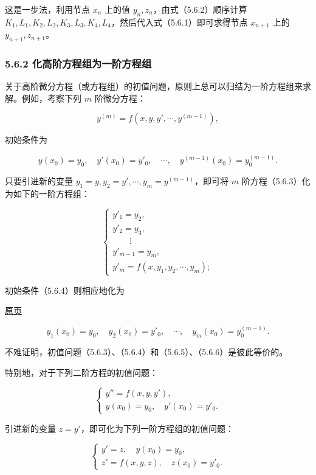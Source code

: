 \documentclass[
  10pt,
  fontset=fandol]{ctexart}
\begin{document}
这是一步法，利用节点 \(x_n\) 上的值 \(y_n,z_n\)，由式（5.6.2）顺序计算 \(K_1,\allowbreak L_1,\allowbreak K_2,\allowbreak L_2,\allowbreak K_3,\allowbreak L_3,\allowbreak K_4,\allowbreak L_4\)，然后代入式（5.6.1）即可求得节点 \(x_{n+1}\) 上的 \(y_{n+1},z_{n+1}\)。

\subsubsection{5.6.2 化高阶方程组为一阶方程组}\label{ux5316ux9ad8ux9636ux65b9ux7a0bux7ec4ux4e3aux4e00ux9636ux65b9ux7a0bux7ec4}

关于高阶微分方程（或方程组）的初值问题，原则上总可以归结为一阶方程组来求解。例如，考察下列 \(m\) 阶微分方程：

\[
y^{(m)}=f(x,y,y',\cdots,y^{(m-1)}),
\tag{5.6.3}
\]

初始条件为

\[
y(x_0)=y_0,\quad y'(x_0)=y'_0,\quad\cdots,\quad y^{(m-1)}(x_0)=y_0^{(m-1)}.
\tag{5.6.4}
\]

只要引进新的变量 \(y_1=y,y_2=y',\cdots,y_m=y^{(m-1)}\)，即可将 \(m\) 阶方程（5.6.3）化为如下的一阶方程组：

\[
\begin{cases}
y'_1=y_2,\\
y'_2=y_3,\\
\qquad\vdots\\
y'_{m-1}=y_m,\\
y'_m=f(x,y_1,y_2,\cdots,y_m);
\end{cases}
\tag{5.6.5}
\]

初始条件（5.6.4）则相应地化为

\href{../../source-images/pdf-147.jpeg}{原页}

\[
y_1(x_0)=y_0,\quad y_2(x_0)=y'_0,\quad\cdots,\quad y_m(x_0)=y_0^{(m-1)}.
\tag{5.6.6}
\]

不难证明，初值问题（5.6.3）、（5.6.4）和（5.6.5）、（5.6.6）是彼此等价的。

特别地，对于下列二阶方程的初值问题：

\[
\begin{cases}
y''=f(x,y,y'),\\
y(x_0)=y_0,\quad y'(x_0)=y'_0.
\end{cases}
\]

引进新的变量 \(z=y'\)，即可化为下列一阶方程组的初值问题：

\[
\begin{cases}
y'=z,\quad y(x_0)=y_0,\\
z'=f(x,y,z),\quad z(x_0)=y'_0.
\end{cases}
\]
\end{document}
